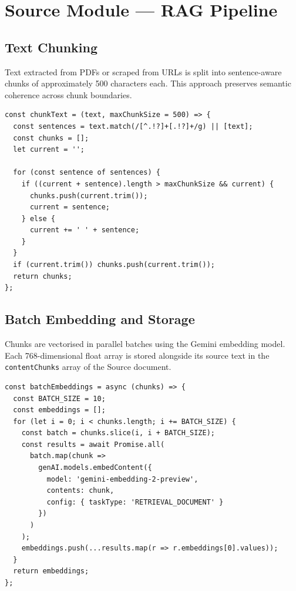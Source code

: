 \documentclass[12pt,a4paper]{report}
\begin{document}
\section{Source Module — RAG Pipeline}

\subsection{Text Chunking}

Text extracted from PDFs or scraped from URLs is split into sentence-aware chunks of approximately 500 characters each. This approach preserves semantic coherence across chunk boundaries.

\begin{lstlisting}[caption={sourceController.js — Sentence-Aware Text Chunking}]
const chunkText = (text, maxChunkSize = 500) => {
  const sentences = text.match(/[^.!?]+[.!?]+/g) || [text];
  const chunks = [];
  let current = '';

  for (const sentence of sentences) {
    if ((current + sentence).length > maxChunkSize && current) {
      chunks.push(current.trim());
      current = sentence;
    } else {
      current += ' ' + sentence;
    }
  }
  if (current.trim()) chunks.push(current.trim());
  return chunks;
};
\end{lstlisting}

\subsection{Batch Embedding and Storage}

Chunks are vectorised in parallel batches using the Gemini embedding model. Each 768-dimensional float array is stored alongside its source text in the \texttt{contentChunks} array of the Source document.

\begin{lstlisting}[caption={sourceController.js — Batch Embedding Generation}]
const batchEmbeddings = async (chunks) => {
  const BATCH_SIZE = 10;
  const embeddings = [];
  for (let i = 0; i < chunks.length; i += BATCH_SIZE) {
    const batch = chunks.slice(i, i + BATCH_SIZE);
    const results = await Promise.all(
      batch.map(chunk =>
        genAI.models.embedContent({
          model: 'gemini-embedding-2-preview',
          contents: chunk,
          config: { taskType: 'RETRIEVAL_DOCUMENT' }
        })
      )
    );
    embeddings.push(...results.map(r => r.embeddings[0].values));
  }
  return embeddings;
};
\end{lstlisting}
\end{document}
